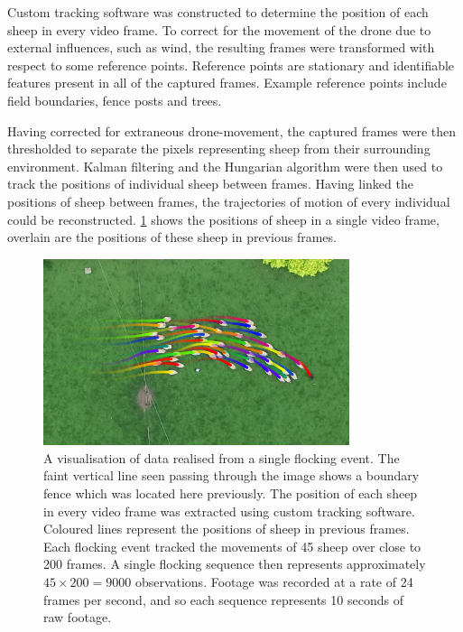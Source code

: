 Custom tracking software was constructed to determine the position of each
sheep in every video frame. To correct for the movement of the drone due to
external influences, such as wind, the resulting frames were transformed with
respect to some reference points. Reference points are stationary and
identifiable features present in all of the captured frames. Example reference
points include field boundaries, fence posts and trees.

Having corrected for extraneous drone-movement, the captured frames were then
thresholded to separate the pixels representing sheep from their surrounding
environment. Kalman filtering \parencite{kalman60} and the Hungarian algorithm
\parencite{kuhn55} were then used to track the positions of individual sheep
between frames. Having linked the positions of sheep between frames, the
trajectories of motion of every individual could be reconstructed.
\cref{fig:sheep_frame} shows the positions of sheep in a single video frame,
overlain are the positions of these sheep in previous frames.

\begin{figure}[tbp]
  \includegraphics[width=0.8\textwidth]{traj0130_crop.png}
  \caption{A visualisation of data realised from a single flocking event. The
    faint vertical line seen passing through the image shows a boundary fence
    which was located here previously. The position of each sheep in every
    video frame was extracted using custom tracking software. Coloured lines
    represent the positions of sheep in previous frames. Each flocking event
    tracked the movements of 45 sheep over close to 200 frames. A single
    flocking sequence then represents approximately $45\times200=9000$
    observations. Footage was recorded at a rate of 24 frames per second, and so
    each sequence represents 10 seconds of raw footage.}
  \label{fig:sheep_frame}
\end{figure}

